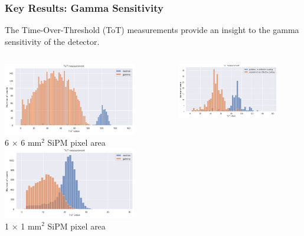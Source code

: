 \documentclass[xcolor=x11names, compress, handout]{beamer}
\renewcommand{\(}{\begin{columns}}
\renewcommand{\)}{\end{columns}}
\newcommand{\<}[1]{\begin{column}{#1}}
\renewcommand{\>}{\end{column}}
\begin{document}
\begin{frame}
  \frametitle{Key Results: Gamma Sensitivity}
  The Time-Over-Threshold (ToT) measurements provide an insight to the gamma sensitivity of the detector. \\
  \begin{columns}
  \begin{column}{0.5\textwidth}
  \centering
  \includegraphics[width=0.8\textwidth]{images/roughness3.png} \\
  \scriptsize 6 $\times$ 6 mm$^2$ SiPM  pixel area
  \includegraphics[width=0.8\textwidth]{images/spectra3.png} \\
  1 $\times$ 1 mm$^2$ SiPM pixel area
  \end{column}
  \begin{column}{0.5\textwidth}
  \centering
  \includegraphics[width=0.8\textwidth]{images/roughness1.png} \\

\end{column}
\end{columns}
\end{frame}
\end{document}
